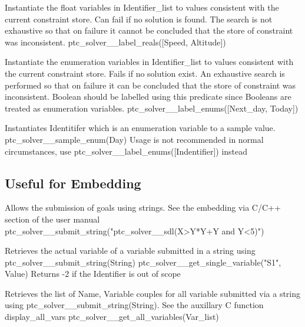 \documentclass{article}
\begin{document}
    {Instantiate the float variables in Identifier\_list to values consistent
with the
    current constraint store. Can fail if no solution is found. The search is
not exhaustive so that on failure it cannot be concluded that the store
of constraint was inconsistent.}
    {ptc\_solver\_\_label\_reals([Speed, Altitude])}
    {}

    {Instantiate the enumeration variables in Identifier\_list to values
consistent
    with the current constraint store. Fails if no solution exist. An
exhaustive search is performed so that on failure it can be concluded
that the store of constraint was inconsistent. Boolean should be labelled
using this predicate since Booleans are treated as enumeration
variables.}
    {ptc\_solver\_\_label\_enums([Next\_day, Today])}
    {}

        {Instantiates Identitifer which is an enumeration variable to a sample
value.}
        {ptc\_solver\_\_sample\_enum(Day)}
        {Usage is not recommended in normal circumstances, use
ptc\_solver\_\_label\_enums([Indentifier]) instead}


\subsection{Useful for Embedding}

\hspace{\parindent}
        {Allows the submission of goals using strings. See the embedding via
C/C++ section of the user manual}
        {ptc\_solver\_\_submit\_string("ptc\_solver\_\_sdl(X>Y*Y+Y and Y<5)")}
        {}

        {Retrieves the actual variable of a variable submitted in a string using
ptc\_solver\_\_submit\_string(String)}
        {ptc\_solver\_\_get\_single\_variable("S1", Value)}
        {Returns -2 if the Identifier is out of scope}

        {Retrieves the list of Name, Variable couples for all variable submitted
via a string using  ptc\_solver\_\_submit\_string(String).
         See the auxillary C function display\_all\_vars}
        {ptc\_solver\_\_get\_all\_variables(Var\_list)}
        {}

\end{document}
